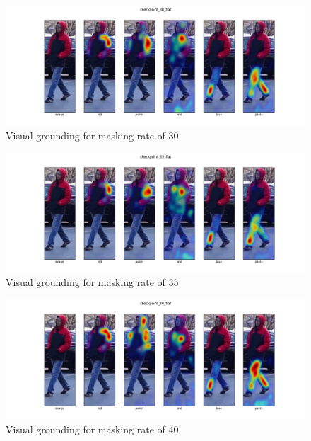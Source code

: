\begin{figure}[htbp]
  \includegraphics[width=\linewidth]{img/mrtd_masking_ratio/mrtd-checkpoint_30_flat.png}
  \caption{Visual grounding for masking rate of 30}
  \label{mtrd_4}
\end{figure}

\begin{figure}[htbp]
  \includegraphics[width=\linewidth]{img/mrtd_masking_ratio/mrtd-checkpoint_35_flat.png}
  \caption{Visual grounding for masking rate of 35}
  \label{mtrd_5}
\end{figure}

\begin{figure}[htbp]
  \includegraphics[width=\linewidth]{img/mrtd_masking_ratio/mrtd-checkpoint_40_flat.png}
  \caption{Visual grounding for masking rate of 40}
  \label{mtrd_6}
\end{figure}